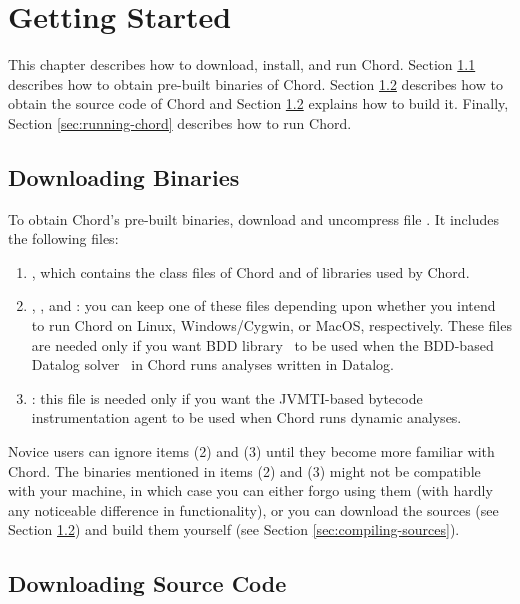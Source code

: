 \chapter{Getting Started}
\label{chap:start}

This chapter describes how to download, install, and run Chord.  Section
\ref{sec:downloading-binaries} describes how to obtain pre-built binaries of
Chord.  Section \ref{sec:downloading-sources} describes how to obtain the source
code of Chord and Section \ref{sec:downloading-sources} explains how to build
it.  Finally, Section \ref{sec:running-chord} describes how to run Chord.

\section{Downloading Binaries}
\label{sec:downloading-binaries}

To obtain Chord's pre-built binaries, download and uncompress file
\chordbinfile.  It includes the following files:

\begin{enumerate}
\item
{}, which contains the class files of Chord and of libraries used
by Chord.
\item
{}, , and : you can keep
one of these files depending upon whether you intend to run Chord on Linux,
Windows/Cygwin, or MacOS, respectively.  These files are needed only if you want
BDD library \buddy\ to be used when the BDD-based Datalog solver \bddbddb\ in
Chord runs analyses written in Datalog.
\item
{}: this file is needed only if you want the
JVMTI-based bytecode instrumentation agent to be used when Chord runs dynamic
analyses.
\end{enumerate}

Novice users can ignore items (2) and (3) until they become more familiar with
Chord.  The binaries mentioned in items (2) and (3) might not be compatible with
your machine, in which case you can either forgo using them (with hardly any
noticeable difference in functionality), or you can download the sources (see
Section \ref{sec:downloading-sources}) and build them yourself (see Section
\ref{sec:compiling-sources}).

\section{Downloading Source Code}
\label{sec:downloading-sources}

